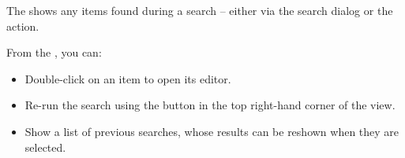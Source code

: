 The \gdsearchresultview{} shows any items found during a search -- either via the search dialog or the  action.

From the \gdsearchresultview{}, you can:

\begin{itemize}
\item Double-click on an item to open its editor. 
\item Re-run the search using the button in the top right-hand corner of the view.
\item Show a list of previous searches, whose results can be reshown when they are selected. 
\end{itemize}
